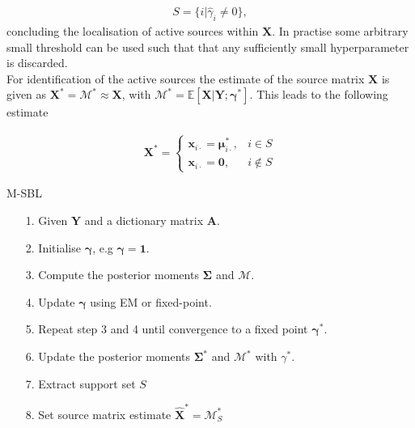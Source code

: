 \begin{align*}
S = \{ i \vert \hat{\gamma}_i \neq 0 \},
\end{align*}
concluding the localisation of active sources within $\textbf{X}$. In practise some arbitrary small threshold can be used such that that any sufficiently small hyperparameter is discarded.\\
For identification of the active sources the estimate of the source matrix $\textbf{X}$ is given as $\textbf{X}^\ast=\mathcal{M}^\ast \approx \textbf{X}$, with $\mathcal{M}^\ast = \mathbb{E}[\textbf{X}\vert \textbf{Y};\boldsymbol{\gamma}^\ast]$. This leads to the following estimate  

\begin{align*}
\mathbf{X}^\ast = 
\begin{cases}
\mathbf{x}_{i\cdot} = \boldsymbol{\mu}_{i \cdot}^\ast, & i \in S \\
\mathbf{x}_{i\cdot} = \mathbf{0}, & i \not \in S
\end{cases}
\end{align*}


\begin{algorithm}[H]
\caption{M-SBL}
\begin{itemize}
\item[1.] Given $\mathbf{Y}$ and a dictionary matrix $\mathbf{A}$.
\item[2.] Initialise $\boldsymbol{\gamma}$, e.g $\boldsymbol{\gamma} = \mathbf{1}$.
\item[3.] Compute the posterior moments $\boldsymbol{\Sigma}$ and $\mathcal{M}$.
\item[4.] Update $\boldsymbol{\gamma}$ using EM or fixed-point.
\item[5.] Repeat step 3 and 4 until convergence to a fixed point $\boldsymbol{\gamma}^\ast$.
\item[6.] Update the posterior moments $\boldsymbol{\Sigma}^\ast$ and $\mathcal{M}^\ast$ with $\gamma^\ast$.
\item[7.] Extract support set $S$
\item[8.] Set source matrix estimate $\hat{\mathbf{X}}^\ast = \mathcal{M}^\ast_S$
\end{itemize}
\end{algorithm}

